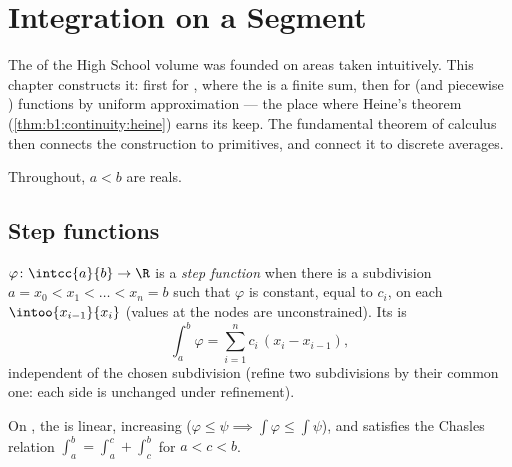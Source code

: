 \chapter{Integration on a Segment}\label{ch:b1:integration}

The  of the High School volume was founded on areas taken
intuitively. This chapter constructs it: first for ,
where the  is a finite sum, then for  (and
piecewise ) functions by uniform approximation --- the
place where Heine's theorem (\cref{thm:b1:continuity:heine}) earns
its keep. The fundamental theorem of calculus then connects the
construction to primitives, and  connect it to discrete
averages.

Throughout, $a < b$ are reals.

\section{Step functions}

\begin{definition}\label{def:b1:integration:step}
$\varphi \colon \intcc{a}{b} \to \R$ is a \emph{step
function} when there is a subdivision $a = x_0
< x_1 < \dots < x_n = b$ such that $\varphi$ is constant, equal to
$c_i$, on each   $\intoo{x_{i-1}}{x_i}$ (values at the
nodes are unconstrained). Its  is
\[
\int_a^b \varphi = \sum_{i=1}^{n} c_i\,(x_i - x_{i-1}),
\]
independent of the chosen subdivision (refine two subdivisions by
their common one: each side is unchanged under refinement).
\end{definition}

\begin{proposition}\label{prop:b1:integration:stepprops}
On , the  is linear, increasing ($\varphi \leq
\psi \implies \int\varphi \leq \int\psi$), and satisfies the Chasles
relation $\int_a^b = \int_a^c + \int_c^b$ for $a < c < b$.
\end{proposition}

